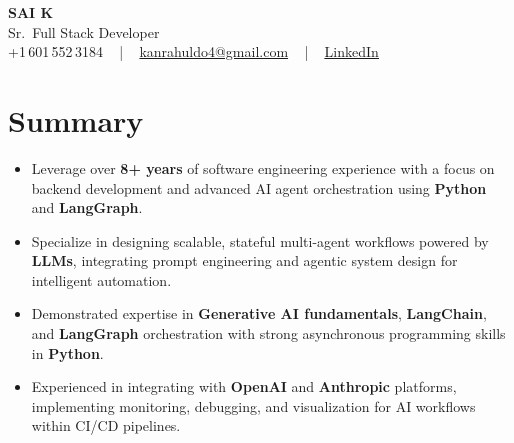\documentclass[letterpaper,11pt]{article}
\newcommand{\resumeItem}[1]{
  \item\footnotesize{
    {#1 \vspace{-2pt}}
  }
}
\newcommand{\resumeItemListStart}{\begin{itemize}[leftmargin=*]}
\newcommand{\resumeItemListEnd}{\end{itemize}\vspace{-5pt}}
\begin{document}
\begin{center}
    {\fontsize{14pt}{12pt}\selectfont \textbf{\MakeUppercase{Sai K}}}\\ \vspace{2pt}
    \fontsize{10pt}{12pt}\selectfont Sr.\ Full Stack Developer\\ \vspace{2pt}
    \fontsize{10pt}{12pt}\selectfont +1\,601\,552\,3184 ~ | ~
    \href{mailto:kanrahuldo4@gmail.com}{kanrahuldo4@gmail.com} ~ | ~
    \href{https://www.linkedin.com/in/srrrk/}{\color{blue}\underline{LinkedIn}}
    \vspace{-10pt}
\end{center}

\section{Summary}
\fontsize{9pt}{10pt}\selectfont
\resumeItemListStart
  \resumeItem{Leverage over \textbf{8+ years} of software engineering experience with a focus on backend development and advanced AI agent orchestration using \textbf{Python} and \textbf{LangGraph}.}
  \resumeItem{Specialize in designing scalable, stateful multi-agent workflows powered by \textbf{LLMs}, integrating prompt engineering and agentic system design for intelligent automation.}
  \resumeItem{Demonstrated expertise in \textbf{Generative AI fundamentals}, \textbf{LangChain}, and \textbf{LangGraph} orchestration with strong asynchronous programming skills in \textbf{Python}.}
  \resumeItem{Experienced in integrating with \textbf{OpenAI} and \textbf{Anthropic} platforms, implementing monitoring, debugging, and visualization for AI workflows within CI/CD pipelines.}
\resumeItemListEnd
\vspace{-6pt}

\end{document}

